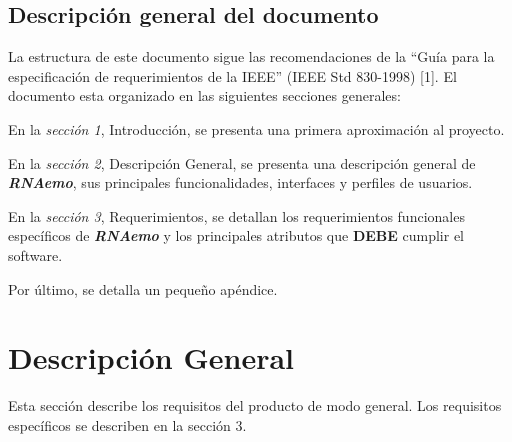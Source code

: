 \documentclass[12pt,a4paper,spanish]{article}
\newcommand{\rnaemo}{\textbf{\emph{RNAemo}}}
\begin{document}
\subsection{Descripción general del documento}
\par La estructura de este documento sigue las recomendaciones de la ``Guía para
la especificación de requerimientos de la IEEE'' (IEEE Std 830-1998) [1].
El documento esta organizado en las siguientes secciones generales: 
\par En la \textit{sección 1}, Introducción, se presenta una primera aproximación al proyecto. 
\par En la \textit{sección 2}, Descripción General, se presenta una descripción general de \rnaemo, sus principales
funcionalidades, interfaces y perfiles de usuarios. 
\par En la \textit{sección 3}, Requerimientos, se detallan los requerimientos funcionales específicos de \textbf{\emph{RNAemo}} y
 los principales atributos que \textbf{DEBE} cumplir el software.
\par Por último, se detalla un pequeño apéndice.

\section{Descripción General}
\label{section-desc-gral}
Esta sección describe los requisitos del producto de modo general. Los
requisitos específicos se describen en la sección 3.
\end{document}
